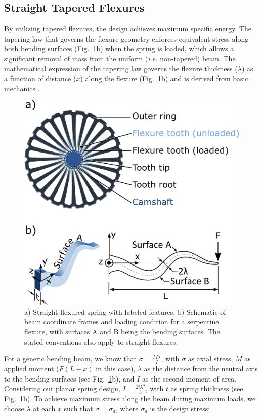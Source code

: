 \documentclass[letterpaper, 10 pt, conference]{ieeeconf} %
\begin{document}
\subsection{Straight Tapered Flexures}
By utilizing tapered flexures, the design achieves maximum specific energy. The tapering law \cite{ShepherdRouseExo2017} that governs the flexure geometry enforces equivalent stress along both bending surfaces (Fig.~\ref{fig:spring_diag}b) when the spring is loaded, which allows a significant removal of mass from the uniform (\textit{i.e.} non-tapered) beam. The mathematical expression of the tapering law governs the flexure thickness ($\lambda$) as a function of distance ($x$) along the flexure (Fig.~\ref{fig:spring_diag}b) and is derived from basic mechanics \cite{GoodnoGere2013}.
\begin{figure}[t!]
    \centering
    \includegraphics[width=\columnwidth]{figs/spring_diagram.png}
    \caption{a) Straight-flexured spring with labeled features. b) Schematic of beam coordinate frames and loading condition for a serpentine flexure, with surfaces A and B being the bending surfaces. The stated conventions also apply to straight flexures.}
    \label{fig:spring_diag}
\end{figure}
For a generic bending beam, we know that $\sigma = \frac{M\lambda}{I}$, with $\sigma$ as axial stress, $M$ as applied moment ($F(L-x)$ in this case), $\lambda$ as the distance from the neutral axis to the bending surfaces (see Fig.~\ref{fig:spring_diag}b), and $I$ as the second moment of area. Considering our planar spring design, $I = \frac{2t\lambda^3}{3}$, with $t$ as spring thickness (see Fig.~\ref{fig:spring_diag}b). To achieve maximum stress along the beam during maximum loads, we choose $\lambda$ at each $x$ such that $\sigma = \sigma_d$, where $\sigma_d$ is the design stress:
\end{document}
